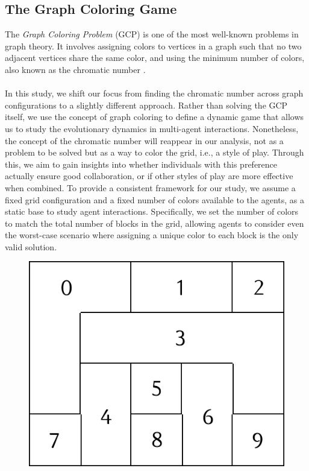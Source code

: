 \subsection{The Graph Coloring Game}
\label{sec:2.1}

\begin{flushleft}

    The \emph{Graph Coloring Problem} (GCP) is one of the most well-known problems in graph theory. It involves assigning colors to vertices in a graph such that no two adjacent vertices share the same color, and using the minimum number of colors, also known as the chromatic number \cite{watkins2023generating}.\\~\\

    In this study, we shift our focus from finding the chromatic number across graph configurations to a slightly different approach. Rather than solving the GCP itself, we use the concept of graph coloring to define a dynamic game that allows us to study the evolutionary dynamics in multi-agent interactions. Nonetheless, the concept of the chromatic number will reappear in our analysis, not as a problem to be solved but as a way to color the grid, i.e., a style of play. Through this, we aim to gain insights into whether individuals with this preference actually ensure good collaboration, or if other styles of play are more effective when combined. To provide a consistent framework for our study, we assume a fixed grid configuration and a fixed number of colors available to the agents, as a static base to study agent interactions. Specifically, we set the number of colors to match the total number of blocks in the grid, allowing agents to consider even the worst-case scenario where assigning a unique color to each block is the only valid solution.
    \begin{figure}[h]
        \centering
        \begin{minipage}{0.46\linewidth}
            \centering
            \includegraphics[width=\linewidth]{images/grid.png}

\end{minipage}
\end{figure}
\end{flushleft}
